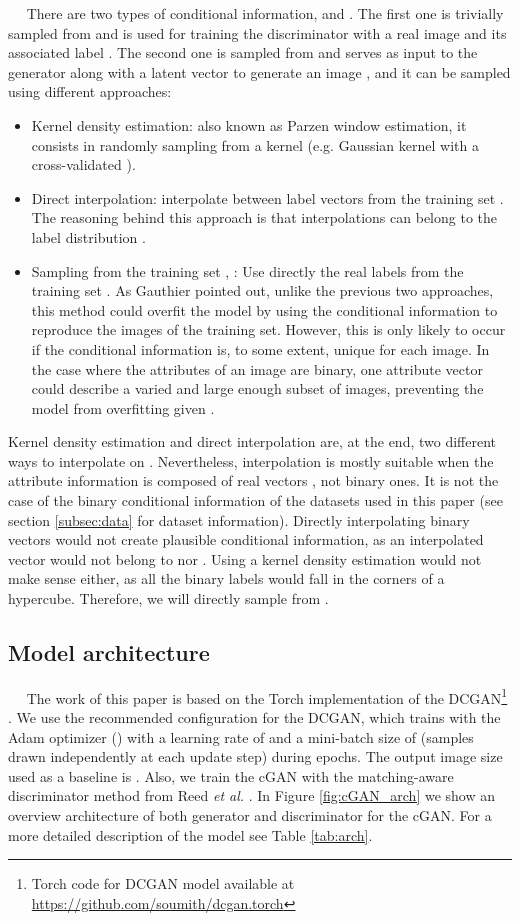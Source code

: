 \documentclass{article}
\newcommand{\minisection}[1]{\vspace{0.04in} \noindent {\bf #1}\ \ }
\begin{document}
\minisection{Conditional sampling} There are two types of conditional information,  and . The first one is trivially sampled from  and is used for training the discriminator  with a real image  and its associated label . The second one is sampled from  and serves as input to the generator  along with a latent vector  to generate an image , and it can be sampled using different approaches:
\begin{itemize}
\item Kernel density estimation: also known as Parzen window estimation, it consists in randomly sampling from a kernel (e.g. Gaussian kernel with a cross-validated ). \item Direct interpolation: interpolate between label vectors  from the training set \citep{Reed2016}. The reasoning behind this approach is that interpolations can belong to the label distribution .
\item Sampling from the training set , : Use directly the real labels  from the training set . As Gauthier \citep{Gauthier2014} pointed out, unlike the previous two approaches, this method could overfit the model by using the conditional information to reproduce the images of the training set. However, this is only likely to occur if the conditional information is, to some extent, unique for each image. In the case where the attributes of an image are binary, one attribute vector  could describe a varied and large enough subset of images, preventing the model from overfitting given .
\end{itemize}

Kernel density estimation and direct interpolation are, at the end, two different ways to interpolate on . Nevertheless, interpolation is mostly suitable when the attribute information  is composed of real vectors , not binary ones. It is not the case of the binary conditional information of the datasets used in this paper (see section \ref{subsec:data} for dataset information). Directly interpolating binary vectors would not create plausible conditional information, as an interpolated vector  would not belong to  nor . Using a kernel density estimation would not make sense either, as all the binary labels would fall in the corners of a hypercube. Therefore, we will directly sample  from .

\subsection{Model architecture} \label{icgan:arch}
\minisection{Conditional GAN}
The work of this paper is based on the Torch implementation of the DCGAN\footnote{Torch code for DCGAN model available at \url{https://github.com/soumith/dcgan.torch}} \cite{Radford2015}. We use the recommended configuration for the DCGAN, which trains with the Adam optimizer \citep{adam2014} () with a learning rate of  and a mini-batch size of  (samples drawn independently at each update step) during  epochs. The output image size used as a baseline is . Also, we train the cGAN with the matching-aware discriminator method from Reed \textit{et al.} \cite{Reed2016}.
In Figure \ref{fig:cGAN_arch} we show an overview architecture of both generator and discriminator for the cGAN. For a more detailed description of the model see Table \ref{tab:arch}.
\end{document}
